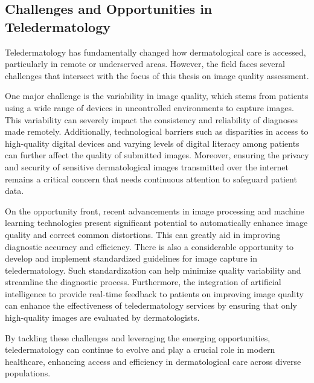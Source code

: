 \subsection{Challenges and Opportunities in Teledermatology}
\label{sub:ChallengesOpportunitiesTeledermatology}
Teledermatology has fundamentally changed how dermatological care is accessed, particularly in remote or underserved areas. However, the field faces several challenges that intersect with the focus of this thesis on image quality assessment.\par
\vspace{\baselineskip}
\noindent
One major challenge is the variability in image quality, which stems from patients using a wide range of devices in uncontrolled environments to capture images. This variability can severely impact the consistency and reliability of diagnoses made remotely. Additionally, technological barriers such as disparities in access to high-quality digital devices and varying levels of digital literacy among patients can further affect the quality of submitted images. Moreover, ensuring the privacy and security of sensitive dermatological images transmitted over the internet remains a critical concern that needs continuous attention to safeguard patient data.\par
\vspace{\baselineskip}
\noindent
On the opportunity front, recent advancements in image processing and machine learning technologies present significant potential to automatically enhance image quality and correct common distortions. This can greatly aid in improving diagnostic accuracy and efficiency. There is also a considerable opportunity to develop and implement standardized guidelines for image capture in teledermatology. Such standardization can help minimize quality variability and streamline the diagnostic process. Furthermore, the integration of artificial intelligence to provide real-time feedback to patients on improving image quality can enhance the effectiveness of teledermatology services by ensuring that only high-quality images are evaluated by dermatologists.\par
\vspace{\baselineskip}
\noindent
By tackling these challenges and leveraging the emerging opportunities, teledermatology can continue to evolve and play a crucial role in modern healthcare, enhancing access and efficiency in dermatological care across diverse populations.\par